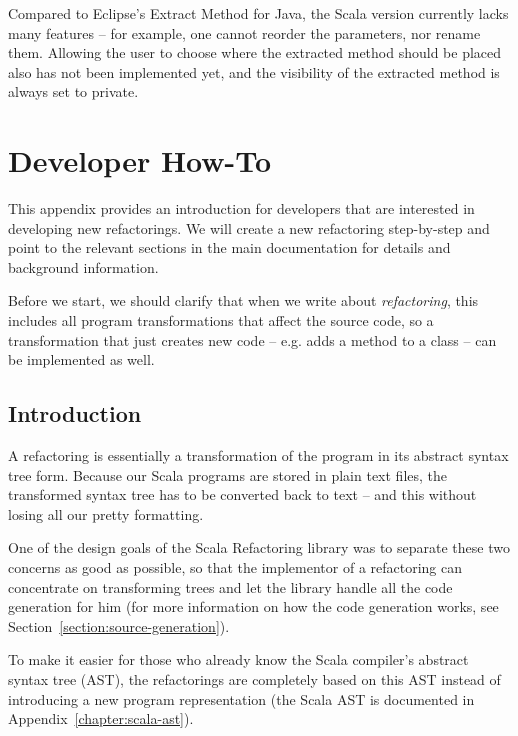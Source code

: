 \documentclass[10pt,a4paper,oneside]{scrreprt}
\begin{document}
Compared to Eclipse's Extract Method for Java, the Scala version currently lacks many features -- for example, one cannot reorder the parameters, nor rename them. Allowing the user to choose where the extracted method should be placed also has not been implemented yet, and the visibility of the extracted method is always set to private.

\chapter{Developer How-To} \label{chapter:developer-how-to}

This appendix provides an introduction for developers that are interested in developing new refactorings. We will create a new refactoring step-by-step and point to the relevant sections in the main documentation for details and background information. 


Before we start, we should clarify that when we write about \textit{refactoring}, this includes all program transformations that affect the source code, so a transformation that just creates new code -- e.g. adds a method to a class -- can be implemented as well.

\section{Introduction}

A refactoring is essentially a transformation of the program in its abstract syntax tree form. Because our Scala programs are stored in plain text files, the transformed syntax tree has to be converted back to text -- and this without losing all our pretty formatting. 

One of the design goals of the Scala Refactoring library was to separate these two concerns as good as possible, so that the implementor of a refactoring can concentrate on transforming trees and let the library handle all the code generation for him (for more information on how the code generation works, see Section~\vref{section:source-generation}). 

To make it easier for those who already know the Scala compiler's abstract syntax tree (AST), the refactorings are completely based on this AST instead of introducing a new program representation (the Scala AST is documented in Appendix~\vref{chapter:scala-ast}). 
\end{document}
